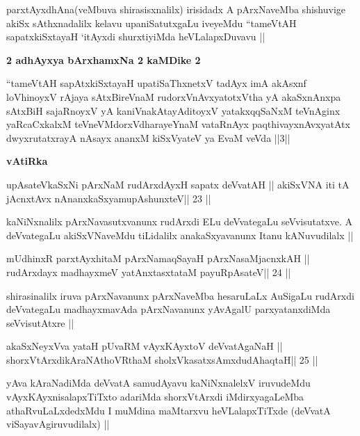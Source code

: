 \begin{artha}
parxtAyxdhAna(veMbuva shirasisxnalilx) irisidadx A pArxNaveMba
shishuvige akiSx sAthxnadalilx kelavu upaniSatutxgaLu iveyeMdu
``tameVtAH sapatxkiSxtayaH `itAyxdi shurxtiyiMda heVLalapxDuvavu ||
\end{artha}

\medskip
\centerline{\textbf{2 adhAyxya bArxhamxNa 2 kaMDike 2}}

\begin{artha}
``tameVtAH sapAtxkiSxtayaH upatiSaThxnetxV tadAyx imA akAsxnf
  loVhinoyxV rAjaya sAtxBireVnaM rudorxV\s nAvxyatotxV\s tha yA
  akaSxnAnxpa sAtxBiH sajaRnoyxV yA kaniVnakAtayA\s ditoyxV
  yatakxqqSaNxM teVnAginx yaRcaCxkalxM teVneVMdorxV\s dharayeYnaM
  vataRnAyx paqthivayxnAvxyatAtx dwyxrutatxrayA nAsayx ananxM
  kiSxVyateV ya EvaM veVda ||3|| 
\end{artha}

\begin{center}
{\large{\textbf{vAtiRka}}}
\end{center}

\begin{shl}
upAsateV\s kaSxNi pArxNaM rudArxdAyxH sapatx deVvatAH ||
akiSxVNA iti tA jAcnxtAvx nAnanxkaSxyamupAshunxteV\hfill || 23 ||
\end{shl}

\begin{artha}
kaNiNxnalilx pArxNavasutxvanunx rudArxdi ELu deVvategaLu
seVvisutatxve. A deVvategaLu akiSxVNaveMdu tiLidalilx anakaSxyavanunx
Itanu kANuvudilalx ||
\end{artha}

\begin{shl}
mUdhinxR parxtAyxhitaM pArxNamaqSayaH pArxNasaMjacnxkAH ||
rudArxdayx madhayxmeV yatAnxtasxtataM payuRpAsateV\hfill || 24 ||
\end{shl}

\begin{artha}
shirasinalilx iruva pArxNavanunx pArxNaveMba hesaruLaLx AuSigaLu
rudArxdi deVvategaLu madhayxmavAda pArxNavanunx yAvAgalU
parxyatanxdiMda seVvisutAtxre ||
\end{artha}

\begin{shl}
akaSxNeyxVva yataH pUvaRM vAyxKAyxtoV deVvatAgaNaH ||
shorxVtArxdikAraNAthoVR\s thaM sholxVkasatxsAmxdudAhaqtaH\hfill || 25 ||
\end{shl}

\begin{artha}
yAva kAraNadiMda deVvatA samudAyavu kaNiNxnalelxV iruvudeMdu
vAyxKAyxnisalapxTiTxto adariMda shorxVtArxdi iMdirxyagaLeMba
athaRvuLaLxdedxMdu I muMdina maMtarxvu heVLalapxTiTxde (deVvatA
viSayavAgiruvudilalx) ||
\end{artha}

